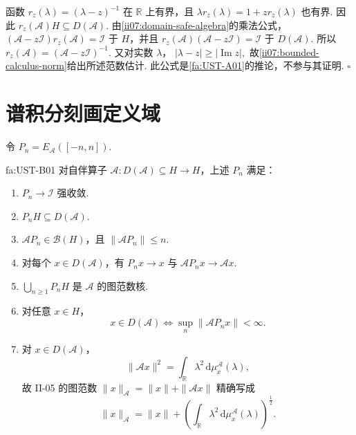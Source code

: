 \begin{FAProof}
函数 \(\displaystyle r_z(\lambda)=(\lambda-z)^{-1}\) 在 \(\displaystyle\mathbb R\) 上有界，且 \(\displaystyle\lambda r_z(\lambda)=1+zr_z(\lambda)\) 也有界. 因此 \(\displaystyle r_z(\mathcal A)H\subseteq D(\mathcal A)\). 由\autoref{ii07:domain-safe-algebra}的乘法公式，
\(\displaystyle (\mathcal A-z\mathcal I)r_z(\mathcal A)=\mathcal I\)
于 \(\displaystyle H\)，并且
\(\displaystyle r_z(\mathcal A)(\mathcal A-z\mathcal I)=\mathcal I\)
于 \(\displaystyle D(\mathcal A)\). 所以 \(\displaystyle r_z(\mathcal A)=(\mathcal A-z\mathcal I)^{-1}\). 又对实数 \(\displaystyle\lambda\)，
\(\displaystyle |\lambda-z|\geqslant|\operatorname{Im}z|,\)
故\autoref{ii07:bounded-calculus-norm}给出所述范数估计. 此公式是\autoref{fa:UST-A01}的推论，不参与其证明.
\hfill\(\square\)
\end{FAProof}

\section{谱积分刻画定义域}\label{sec:ii07-domain-spectral-integral}

令
\(\displaystyle P_n=E_{\mathcal A}([-n,n]).\)

\begin{FATheorem}[B][自伴谱测度的定义域刻画与谱截断核]{fa:UST-B01}
对自伴算子 \(\displaystyle\mathcal A:D(\mathcal A)\subseteq H\to H\)，上述 \(\displaystyle P_n\) 满足：
\begin{enumerate}[label=\textnormal{(\roman*)}]
\item \(\displaystyle P_n\to\mathcal I\) 强收敛.
\item \(\displaystyle P_nH\subseteq D(\mathcal A)\).
\item \(\displaystyle\mathcal AP_n\in\mathcal B(H)\)，且 \(\displaystyle\|\mathcal AP_n\|\leqslant n\).
\item 对每个 \(\displaystyle x\in D(\mathcal A)\)，有 \(\displaystyle P_nx\to x\) 与 \(\displaystyle\mathcal AP_nx\to\mathcal Ax\).
\item \(\displaystyle\bigcup_{n\geqslant1}P_nH\) 是 \(\displaystyle\mathcal A\) 的图范数核.
\item 对任意 \(\displaystyle x\in H\)，
\[
x\in D(\mathcal A)
\iff
\sup_n\|\mathcal AP_nx\|<\infty.
\]
\item 对 \(\displaystyle x\in D(\mathcal A)\)，
\[
\|\mathcal Ax\|^2
=
\int_{\mathbb R}\lambda^2\,\mathrm{d}\mu_x^{\mathcal A}(\lambda),
\]
故 II-05 的图范数
\(\displaystyle \|x\|_{\mathcal A}=\|x\|+\|\mathcal Ax\|\)
精确写成
\[
\|x\|_{\mathcal A}
=
\|x\|
+
\left(
\int_{\mathbb R}\lambda^2\,\mathrm{d}\mu_x^{\mathcal A}(\lambda)
\right)^{\frac{1}{2}}.
\]
\end{enumerate}
\end{FATheorem}

